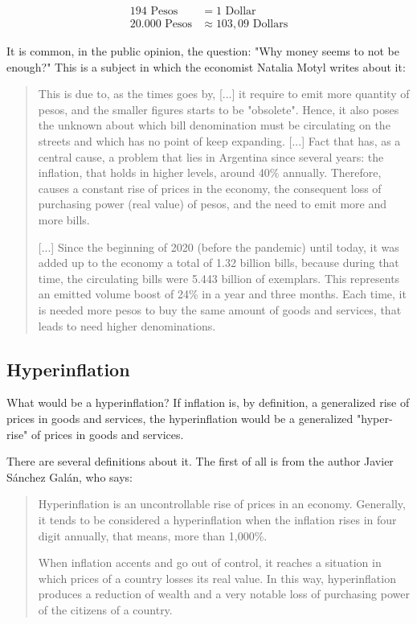 \documentclass[12pt,a4paper,twoside]{book}
\begin{document}
\begin{align*}
194 \text{ Pesos} &= 1 \text{ Dollar}  \\
20.000 \text{ Pesos} & \approx 103,09 \text{ Dollars}
\end{align*}

It is common, in the public opinion, the question: "Why money seems to not be enough?" This is a subject in which the economist Natalia Motyl writes about it:

\begin{quotation}
This is due to, as the times goes by, [...] it require to emit more quantity of pesos, and the smaller figures starts to be "obsolete". Hence, it also poses the unknown about which bill denomination must be circulating on the streets and which has no point of keep expanding. [...] Fact that has, as a central cause, a problem that lies in Argentina since several years: the inflation, that holds in higher levels, around 40\% annually. Therefore, causes a constant rise of prices in the economy, the consequent loss of purchasing power (real value) of pesos, and the need to emit more and more bills.

[...] Since the beginning of 2020 (before the pandemic) until today, it was added up to the economy a total of 1.32 billion bills, because during that time, the circulating bills were 5.443 billion of exemplars. This represents an emitted volume boost of 24\% in a year and three months. Each time, it is needed more pesos to buy the same amount of goods and services, that leads to need higher denominations. \cite{motyl:pesos}
\end{quotation}

\subsection{Hyperinflation}
What would be a hyperinflation? If inflation is, by definition, a generalized rise of prices in goods and services, the hyperinflation would be a generalized "hyper-rise" of prices in goods and services.

There are several definitions about it. The first of all is from the author Javier Sánchez Galán, who says:

\begin{quotation}
Hyperinflation is an uncontrollable rise of prices in an economy. Generally, it tends to be considered a hyperinflation when the inflation rises in four digit annually, that means, more than 1,000\%.

When inflation accents and go out of control, it reaches a situation in which prices of a country losses its real value. In this way, hyperinflation produces a reduction of wealth and a very notable loss of purchasing power of the citizens of a country. \cite{epedia:hiper}
\end{quotation}
\end{document}
